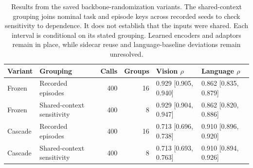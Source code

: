 \begin{table}[htbp]
\centering\small
\setlength{\tabcolsep}{3.5pt}
\caption{Results from the saved backbone-randomization variants. The shared-context grouping joins nominal task and episode keys across recorded seeds to check sensitivity to dependence. It does not establish that the inputs were shared. Each interval is conditional on its stated grouping. Learned encoders and adaptors remain in place, while sidecar reuse and language-baseline deviations remain unresolved.}
\label{tab:variants}
\begin{tabular}{llrrll}
\toprule
Variant & Grouping & Calls & Groups & Vision $\rho$ & Language $\rho$ \\
\midrule
Frozen & Recorded episodes & 400 & 16 & 0.929 [0.905, 0.940] & 0.862 [0.835, 0.879] \\
Frozen & Shared-context sensitivity & 400 & 8 & 0.929 [0.904, 0.947] & 0.862 [0.820, 0.886] \\
Cascade & Recorded episodes & 400 & 16 & 0.713 [0.696, 0.738] & 0.910 [0.896, 0.920] \\
Cascade & Shared-context sensitivity & 400 & 8 & 0.713 [0.693, 0.763] & 0.910 [0.894, 0.926] \\
\bottomrule
\end{tabular}
\end{table}
